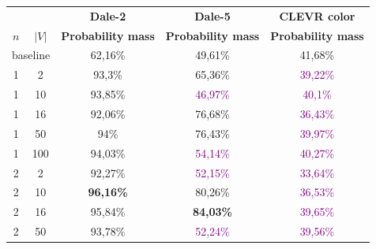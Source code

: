 \begin{table}[ht]
    \centering
    \begin{tabular}{cc|c|c|c}
        \toprule
                                      &           & \multicolumn{1}{c}{\textbf{Dale-2}} & \multicolumn{1}{c}{\textbf{Dale-5}} & \multicolumn{1}{c}{\textbf{CLEVR color}} \\  \cmidrule(lr){3-3}\cmidrule(lr){4-4}\cmidrule(lr){5-5}
        $n$                           & $|V|$     & \textbf{Probability mass}           & \textbf{Probability mass}           & \textbf{Probability mass}                \\\midrule
        \multicolumn{2}{c|}{baseline} & {62,16\%} & {49,61\%}                           & {41,68\%}                                                                      \\\midrule
        {1}                           & {2}       & {93,3\%}                            & {65,36\%}                           & \textcolor{purple}{39,22\%}              \\
        {1}                           & {10}      & {93,85\%}                           & \textcolor{purple}{46,97\%}         & \textcolor{purple}{40,1\%}               \\
        {1}                           & {16}      & {92,06\%}                           & {76,68\%}                           & \textcolor{purple}{36,43\%}              \\
        {1}                           & {50}      & {94\%}                              & {76,43\%}                           & \textcolor{purple}{39,97\%}              \\
        {1}                           & {100}     & {94,03\%}                           & \textcolor{purple}{54,14\%}         & \textcolor{purple}{40,27\%}              \\
        {2}                           & {2}       & {92,27\%}                           & \textcolor{purple}{52,15\%}         & \textcolor{purple}{33,64\%}              \\
        {2}                           & {10}      & \textbf{96,16\%}                    & {80,26\%}                           & \textcolor{purple}{36,53\%}              \\
        {2}                           & {16}      & {95,84\%}                           & \textbf{84,03\%}                    & \textcolor{purple}{39,65\%}              \\
        {2}                           & {50}      & {93,78\%}                           & \textcolor{purple}{52,24\%}         & \textcolor{purple}{39,56\%}              \\

\end{tabular}
\end{table}

